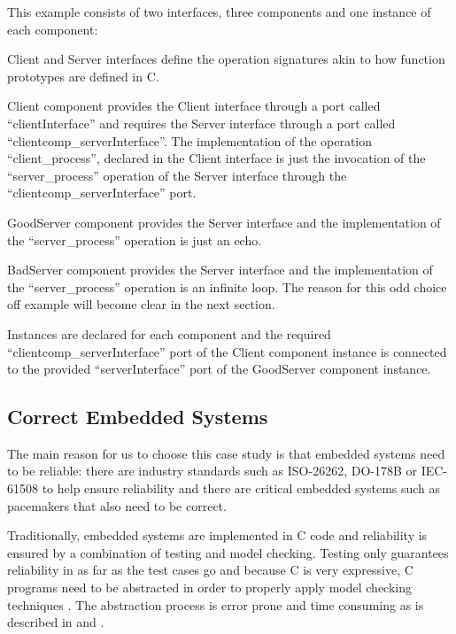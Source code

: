 This example consists of two interfaces, three components and one instance of each component:
\begin{compactdesc}
\item[Client and Server interfaces] define the operation signatures akin to how function prototypes are defined in C.
\item[Client component] provides the Client interface through a port called ``clientInterface'' and requires the Server interface through a port called ``clientcomp\_serverInterface''. The implementation of the operation ``client\_process'', declared in the Client interface is just the invocation of the ``server\_process'' operation of the Server interface through the ``clientcomp\_serverInterface'' port.
\item[GoodServer component] provides the Server interface and the implementation of the ``server\_process'' operation is just an echo.
\item[BadServer component] provides the Server interface and the implementation of the ``server\_process'' operation is an infinite loop. The reason for this odd choice off example will become clear in the next section.
\item[Instances] are declared for each component and the required ``clientcomp\_serverInterface'' port of the Client component instance is connected to the provided ``serverInterface'' port of the GoodServer component instance.
\end{compactdesc}


\subsection{Correct Embedded Systems}

The main reason for us to choose this case study is that embedded systems need to be reliable: there are industry standards such as ISO-26262, DO-178B or IEC-61508 to help ensure reliability and there are critical embedded systems such as pacemakers \cite{mry_et_al:DR:2014:4543} that also need to be correct.

Traditionally, embedded systems are implemented in C code and reliability is ensured by a combination of testing and model checking. Testing only guarantees reliability in as far as the test cases go and because C is very expressive, C programs need to be abstracted in order to properly apply model checking techniques \cite{Ivancic2005}. 
The abstraction process is error prone and time consuming as is described in \cite{Corbett2000} and \cite{Ratiu:2012:LEE:2663689.2663692}.

